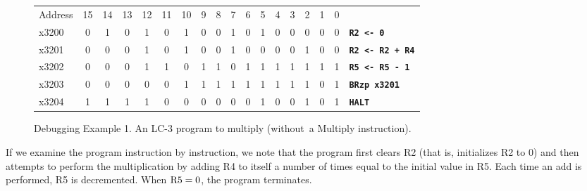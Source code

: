 \documentclass{patt}
\begin{document}
\FloatBarrier
\setcounter{figure}{3}
\begin{figure}
\begin{minipage}{36pc}
\noindent\small
{\renewcommand{\tabcolsep}{5pt}
\begin{tabular}{@{}l c c c c c c c c c c c c c c c c r}
Address & 15 & 14 & 13 & 12 & 11 & 10 & 9 & 8 & 7 & 6 & 5 & 4 & 3  & 2 & 1 & 0 \\
\cline{2-17}
x3200 & \multicolumn{1}{|c}{0} & 1 & 0 & \multicolumn{1}{c|}{1} & 0 & 1 & \multicolumn{1}{c|}{0} & 0 & 1 & \multicolumn{1}{c|}{0} & \multicolumn{1}{c|}{1} & 0 & 0 & 0 & 0 & \multicolumn{1}{c|}{0} & \multicolumn{1}{l}{\tt\bfseries R2 <- 0 }\\
\cline{2-17}
x3201 & \multicolumn{1}{|c}{0} & 0 & 0 & \multicolumn{1}{c|}{1} & 0 & 1 & \multicolumn{1}{c|}{0} & 0 & 1 & \multicolumn{1}{c|}{0} & \multicolumn{1}{c|}{0} & 0 & \multicolumn{1}{c|}{0} & 1 & 0 & \multicolumn{1}{c|}{0} & \multicolumn{1}{l}{\tt\bfseries R2 <- R2 + R4}\\
\cline{2-17}
x3202 & \multicolumn{1}{|c}{0} & 0 & 0 & \multicolumn{1}{c|}{1} & 1 & 0 & \multicolumn{1}{c|}{1} & 1 & 0 & \multicolumn{1}{c|}{1} & \multicolumn{1}{c|}{1} & 1 & 1 & 1 & 1 & \multicolumn{1}{c|}{1} & \multicolumn{1}{l}{\tt\bfseries R5 <- R5 - 1}\\
\cline{2-17}
x3203 & \multicolumn{1}{|c}{0} & 0 & 0 & \multicolumn{1}{c|}{0} & 0 & 1 & \multicolumn{1}{c|}{1} & 1 & 1 & 1 & 1 & 1 & 1 & 1 & 0 & \multicolumn{1}{c|}{1} & \multicolumn{1}{l}{\tt\bfseries BRzp x3201}\\
\cline{2-17}
x3204 & \multicolumn{1}{|c}{1} & 1 & 1 & \multicolumn{1}{c|}{1} & 0 & 0 & 0 & \multicolumn{1}{c|}{0} & 0 & 0 & 1 & 0 & 0 & 1 & 0 & \multicolumn{1}{c|}{1} & \multicolumn{1}{l}{\tt\bfseries HALT}\\
\cline{2-17}
\end{tabular}
\caption{Debugging Example 1.  An LC-3 program to multiply (without~a
  Multiply instruction).
\label{fig:onlinedebug_code}}}
\end{minipage}
\end{figure}

If we examine the program instruction by instruction, we note that
the program first clears R2 (that is, initializes R2 to 0) and then
attempts to perform the multiplication by adding R4 to itself a number
of times equal to the initial value in R5.  Each time an add is performed,
R5 is decremented.  When ${\rm R}5=0$, the program terminates.
\end{document}
